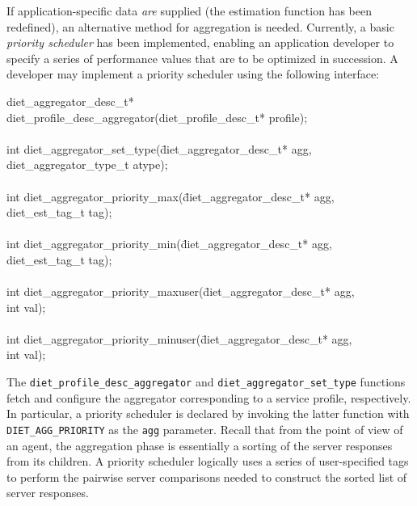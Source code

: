 If application-specific data \emph{are} supplied (\ie the estimation function
has been redefined), an alternative method for aggregation is needed.
Currently, a basic \emph{priority scheduler} has been implemented, enabling an
application developer to specify a series of performance values that are to be
optimized in succession.  A developer may implement a priority scheduler using
the following interface:
\begin{code}
\begin{tabbing}
diet\_aggregator\_desc\_t* \\
diet\_profile\_desc\_aggregator(diet\_profile\_desc\_t* profile); \\
\\
int diet\_aggregator\_set\_type(\=diet\_aggregator\_desc\_t* agg, \\
\> diet\_aggregator\_type\_t atype); \\
\\
int diet\_aggregator\_priority\_max(\=diet\_aggregator\_desc\_t* agg, \\
\> diet\_est\_tag\_t tag); \\
\\
int diet\_aggregator\_priority\_min(\=diet\_aggregator\_desc\_t* agg, \\
\> diet\_est\_tag\_t tag); \\
\\
int diet\_aggregator\_priority\_maxuser(\=diet\_aggregator\_desc\_t* agg, \\
\> int val); \\
\\
int diet\_aggregator\_priority\_minuser(\=diet\_aggregator\_desc\_t* agg, \\
\> int val); \\
\end{tabbing}
\end{code}
The \texttt{diet\_profile\_desc\_aggregator} and
\texttt{diet\_aggregator\_set\_type} functions fetch and configure the
aggregator corresponding to a \diet service profile, respectively.  In
particular, a priority scheduler is declared by invoking the latter function
with \texttt{DIET\_AGG\_PRIORITY} as the \texttt{agg} parameter.  Recall that
from the point of view of an agent, the aggregation phase is essentially a
sorting of the server responses from its children.  A priority scheduler
logically uses a series of user-specified tags to perform the pairwise server
comparisons needed to construct the sorted list of server responses.

